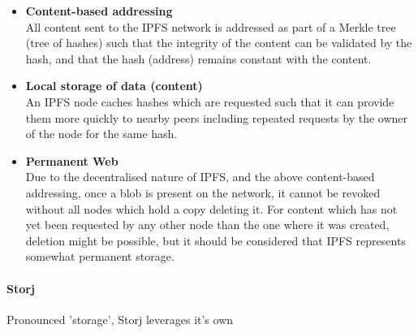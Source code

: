 \begin{itemize}
	\item 
    	\textbf{Content-based addressing} \\
        All content sent to the IPFS network is addressed as part of a Merkle tree (tree of hashes) such that the integrity of the content can be validated by the hash, and that the hash (address) remains constant with the content.
    \item 
    	\textbf{Local storage of data (content)} \\
        An IPFS node caches hashes which are requested such that it can provide them more quickly to nearby peers including repeated requests by the owner of the node for the same hash.
    \item 
    	\textbf{Permanent Web} \\
        Due to the decentralised nature of IPFS, and the above content-based addressing, once a blob is present on the network, it cannot be revoked without all nodes which hold a copy deleting it. For content which has not yet been requested by any other node than the one where it was created, deletion might be possible, but it should be considered that IPFS represents somewhat permanent storage.
\end{itemize}

\paragraph{Storj}

Pronounced 'storage', Storj leverages it's own  
